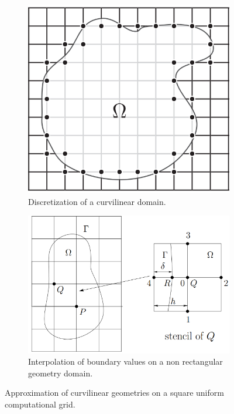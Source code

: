 \begin{figure}
	\begin{subfigure}[t]{0.381\textwidth}
		\includegraphics[width=\linewidth]{./images/CA_FDM/grid_custom_shape}
		\caption{Discretization of a curvilinear domain.}
		\label{fig:gridcustomshape}
	\end{subfigure}\hspace{0.4cm}	
	\begin{subfigure}[t]{0.52\textwidth}
		\includegraphics[width=\linewidth]{./images/CA_FDM/gridcustom_shape2}
		\caption{Interpolation of boundary values on a non rectangular geometry domain.}
		\label{fig:gridcustom_shape2}
	\end{subfigure}
\caption{Approximation of curvilinear geometries on a square uniform computational grid. }
\label{fig:approximation_complex_geometries}
\end{figure}

